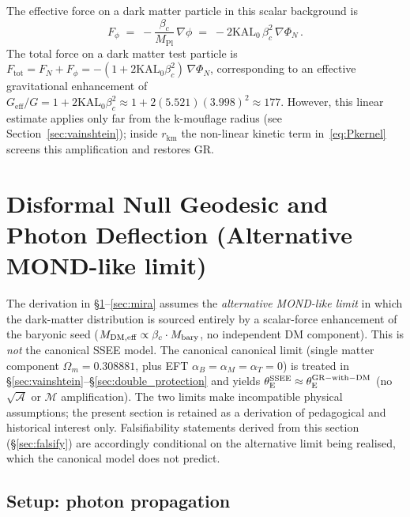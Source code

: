 \documentclass[12pt,a4paper]{article}
\newcommand{\KAL}{\mathrm{KAL}_0}
\newcommand{\MIRA}{\mathcal{M}}
\newcommand{\AURA}{\mathcal{A}}
\newcommand{\Mpl}{M_{\mathrm{Pl}}}
\newcommand{\bc}{\beta_c}
\newcommand{\rV}{r_{\mathrm{km}}}
\newcommand{\thetaE}{\theta_{\mathrm{E}}}
\begin{document}
The effective force on a dark matter particle in this scalar background is
\begin{equation}
  F_\phi \;=\; -\frac{\bc}{\Mpl}\,\nabla\phi
         \;=\; -2\KAL\,\bc^2\,\nabla\Phi_N\,.
  \label{eq:scalar_force}
\end{equation}
The total force on a dark matter test particle is
$F_{\mathrm{tot}} = F_N + F_\phi = -(1 + 2\KAL\bc^2)\,\nabla\Phi_N$,
corresponding to an effective gravitational enhancement of
$G_{\mathrm{eff}}/G = 1 + 2\KAL\bc^2 \approx 1 + 2(5.521)(3.998)^2
\approx 177$.
However, this linear estimate applies only far from the k-mouflage radius
(see Section~\ref{sec:vainshtein}); inside $\rV$ the non-linear kinetic term
in~\eqref{eq:Pkernel} screens this amplification and restores GR.

\section{Disformal Null Geodesic and Photon Deflection (Alternative MOND-like limit)}
\label{sec:geodesic}

\begin{tcolorbox}[colback=yellow!8,colframe=orange!60,title=Scope of this section]
The derivation in \S\ref{sec:geodesic}--\ref{sec:mira} assumes the
\emph{alternative MOND-like limit} in which the dark-matter distribution is
sourced entirely by a scalar-force enhancement of the baryonic seed
($M_{\rm DM,eff}\propto\bc\cdot M_{\rm bary}$, no independent DM
component). This is \emph{not} the canonical SSEE model. The canonical
canonical limit (single matter component $\Omega_m=0.308881$, plus EFT
$\alpha_B=\alpha_M=\alpha_T=0$) is treated in
\S\ref{sec:vainshtein}--\S\ref{sec:double_protection} and yields
$\thetaE^{\rm SSEE}\approx\thetaE^{\rm GR-with-DM}$ (no $\sqrt{\AURA}$ or
$\MIRA$ amplification). The two limits make incompatible physical
assumptions; the present section is retained as a derivation of pedagogical
and historical interest only. Falsifiability statements derived from this
section (\S\ref{sec:falsify}) are accordingly conditional on the alternative
limit being realised, which the canonical model does not predict.
\end{tcolorbox}

\subsection{Setup: photon propagation}
\end{document}

